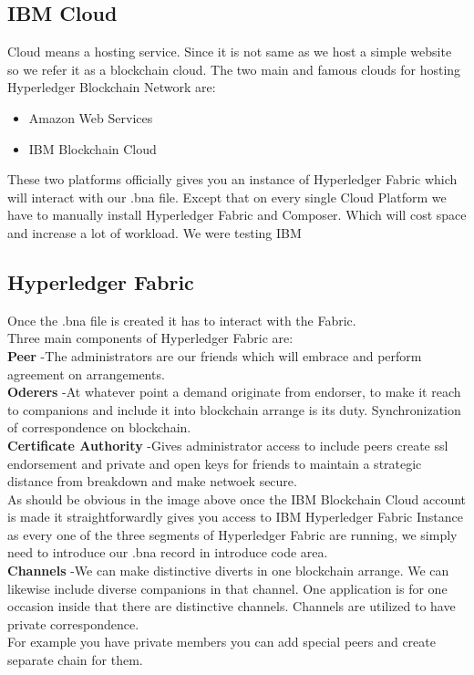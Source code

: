 \subsection{IBM Cloud }
Cloud means a hosting service. Since it is not same as we host a simple website so we refer it as a blockchain cloud. The two main and famous clouds for hosting Hyperledger Blockchain Network are:

\begin{itemize}
	\item Amazon Web Services
	\item IBM Blockchain Cloud
	
\end{itemize}
These two platforms officially gives you an instance of Hyperledger Fabric which will interact with our .bna file.
Except that on every single Cloud Platform we have to manually install Hyperledger Fabric and Composer. Which will cost space and increase a lot of workload. We were testing IBM 
\subsection{Hyperledger Fabric}
Once the .bna file is created it has to interact with the Fabric.\\
Three main components of Hyperledger Fabric are: \\
\textbf{ Peer  }-The administrators are our friends which will embrace and perform agreement on arrangements.\\
\textbf{ Oderers  }-At whatever point a demand originate from endorser, to make it reach to companions and include it into blockchain arrange is its duty. Synchronization of correspondence on blockchain.\\
\textbf{Certificate Authority }-Gives administrator access to include peers create ssl endorsement and private and open keys for friends to maintain a strategic distance from breakdown and make netwoek secure. \\
As should be obvious in the image above once the IBM Blockchain Cloud account is made it straightforwardly gives you access to IBM Hyperledger Fabric Instance as every one of the three segments of Hyperledger Fabric are running, we simply need to introduce our .bna record in introduce code area.\\
\textbf{Channels }-We can make distinctive diverts in one blockchain arrange. We can likewise include diverse companions in that channel. One application is for one occasion inside that there are distinctive channels. 
Channels are utilized to have private correspondence.\\
For example you have private members you can add special peers and create separate chain for them.